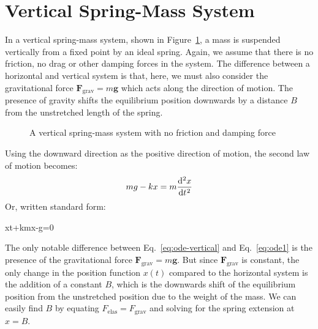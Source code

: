 \section{Vertical Spring-Mass System}

In a vertical spring-mass system, shown in
Figure~\ref{fig:vertical-spring-mass}, a mass is suspended vertically from a
fixed point by an ideal spring. Again, we assume that there is no friction, no
drag or other damping forces in the system. The difference between a horizontal
and vertical system is that, here, we must also consider the gravitational force
$\bm F_\text{grav}=m\bm g$ which acts along the direction of motion. The
presence of gravity shifts the equilibrium position downwards by a distance $B$
from the unstretched length of the spring.
\begin{figure}[ht]
  \centering
  \caption{A vertical spring-mass system with no friction and damping force}
  \label{fig:vertical-spring-mass}
\end{figure}

Using the downward direction as the positive direction of motion, the second
law of motion becomes:
\begin{equation*}
  mg-kx=m\diff[2]xt
\end{equation*}
Or, written standard form:
\begin{important-equation}
  \diff[2]xt+\frac kmx-g=0
  \label{eq:ode-vertical}
\end{important-equation}
The only notable difference between Eq.~\ref{eq:ode-vertical} and
Eq.~\ref{eq:ode1} is the presence of the gravitational force
$\bm F_\text{grav}=m\bm g$. But since $\bm F_\text{grav}$ is constant, the only
change in the position function $x(t)$ compared to the horizontal system is the
addition of a constant $B$, which is the downwards shift of the equilibrium
position from the unstretched position due to the weight of the mass. We can
easily find $B$ by equating $F_\text{elas}=F_\text{grav}$ and solving for the
spring extension at $x=B$.

